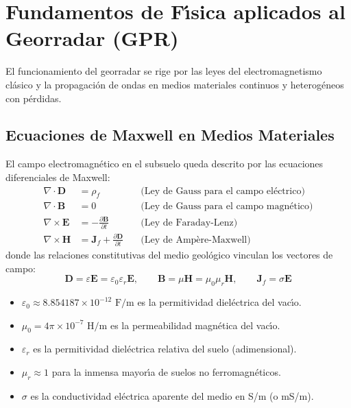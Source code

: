 \documentclass[11pt,a4paper]{article}
\begin{document}
\section{Fundamentos de F{\'\i}sica aplicados al Georradar (GPR)}

El funcionamiento del georradar se rige por las leyes del electromagnetismo cl{\'a}sico y la propagaci{\'o}n de ondas en medios materiales continuos y heterog{\'e}neos con p{\'e}rdidas.

\subsection{Ecuaciones de Maxwell en Medios Materiales}
El campo electromagn{\'e}tico en el subsuelo queda descrito por las ecuaciones diferenciales de Maxwell:
\begin{align}
    \nabla \cdot \mathbf{D} &= \rho_f \quad &\text{(Ley de Gauss para el campo el{\'e}ctrico)} \\
    \nabla \cdot \mathbf{B} &= 0 \quad &\text{(Ley de Gauss para el campo magn{\'e}tico)} \\
    \nabla \times \mathbf{E} &= -\frac{\partial \mathbf{B}}{\partial t} \quad &\text{(Ley de Faraday-Lenz)} \\
    \nabla \times \mathbf{H} &= \mathbf{J}_f + \frac{\partial \mathbf{D}}{\partial t} \quad &\text{(Ley de Amp{\`e}re-Maxwell)}
\end{align}
donde las relaciones constitutivas del medio geol{\'o}gico vinculan los vectores de campo:
\begin{equation}
    \mathbf{D} = \varepsilon \mathbf{E} = \varepsilon_0 \varepsilon_r \mathbf{E}, \qquad \mathbf{B} = \mu \mathbf{H} = \mu_0 \mu_r \mathbf{H}, \qquad \mathbf{J}_f = \sigma \mathbf{E}
\end{equation}
\begin{itemize}
    \item $\varepsilon_0 \approx 8.854187 \times 10^{-12} \text{ F/m}$ es la permitividad diel{\'e}ctrica del vac{\'\i}o.
    \item $\mu_0 = 4\pi \times 10^{-7} \text{ H/m}$ es la permeabilidad magn{\'e}tica del vac{\'\i}o.
    \item $\varepsilon_r$ es la permitividad diel{\'e}ctrica relativa del suelo (adimensional).
    \item $\mu_r \approx 1$ para la inmensa mayor{\'\i}a de suelos no ferromagn{\'e}ticos.
    \item $\sigma$ es la conductividad el{\'e}ctrica aparente del medio en S/m (o mS/m).
\end{itemize}
\end{document}
